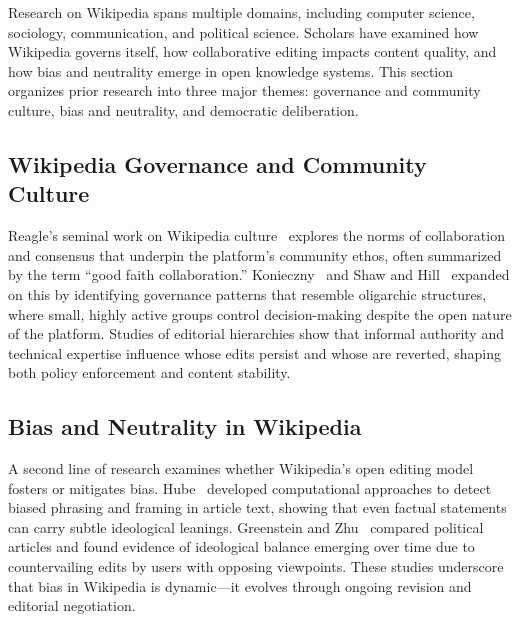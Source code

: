 
\label{sec:related}

Research on Wikipedia spans multiple domains, including computer science, sociology, communication, and political science. Scholars have examined how Wikipedia governs itself, how collaborative editing impacts content quality, and how bias and neutrality emerge in open knowledge systems. This section organizes prior research into three major themes: governance and community culture, bias and neutrality, and democratic deliberation.

\subsection{Wikipedia Governance and Community Culture}

Reagle’s seminal work on Wikipedia culture~ \cite{reagle2010good} explores the norms of collaboration and consensus that underpin the platform’s community ethos, often summarized by the term “good faith collaboration.” Konieczny~\cite{konieczny2009governance} and Shaw and Hill~\cite{shaw2014laboratories} expanded on this by identifying governance patterns that resemble oligarchic structures, where small, highly active groups control decision-making despite the open nature of the platform. Studies of editorial hierarchies show that informal authority and technical expertise influence whose edits persist and whose are reverted, shaping both policy enforcement and content stability.

\subsection{Bias and Neutrality in Wikipedia}
A second line of research examines whether Wikipedia’s open editing model fosters or mitigates bias. Hube~\cite{10.1145/3041021.3053375} developed computational approaches to detect biased phrasing and framing in article text, showing that even factual statements can carry subtle ideological leanings. Greenstein and Zhu~\cite{greenstein2012wikipedia} compared political articles and found evidence of ideological balance emerging over time due to countervailing edits by users with opposing viewpoints. These studies underscore that bias in Wikipedia is dynamic—it evolves through ongoing revision and editorial negotiation.


